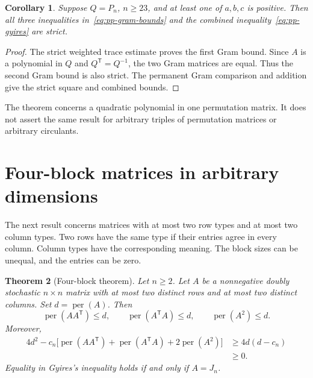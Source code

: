 \documentclass[11pt,a4paper]{article}
\newtheorem{theorem}{Theorem}[section]
\newtheorem{corollary}[theorem]{Corollary}
\theoremstyle{definition}
\theoremstyle{remark}
\newcommand{\per}{\operatorname{per}}
\newcommand{\T}{\mathsf{T}}
\begin{document}
\begin{corollary}\label{cor:pp-strict-cycle}
Suppose $Q=P_n$, $n\ge23$, and at least one of $a,b,c$ is positive.
Then all three inequalities in~\eqref{eq:pp-gram-bounds} and the combined inequality~\eqref{eq:pp-gyires} are strict.
\end{corollary}

\begin{proof}
The strict weighted trace estimate proves the first Gram bound.
Since $A$ is a polynomial in $Q$ and $Q^\T=Q^{-1}$, the two Gram matrices are equal.
Thus the second Gram bound is also strict.
The permanent Gram comparison and addition give the strict square and combined bounds.
\end{proof}

The theorem concerns a quadratic polynomial in one permutation matrix.
It does not assert the same result for arbitrary triples of permutation matrices or arbitrary circulants.

\section{Four-block matrices in arbitrary dimensions}\label{sec:four-block}

The next result concerns matrices with at most two row types and at most two column types. Two rows have the same type if their entries agree
in every column. Column types have the corresponding meaning. The block
sizes can be unequal, and the entries can be zero.

\begin{theorem}[Four-block theorem]\label{thm:four-block}
Let $n\geq 2$. Let $A$ be a nonnegative doubly stochastic $n\times n$
matrix with at most two distinct rows and at most two distinct columns.
Set $d=\per(A)$. Then
\begin{equation}\label{eq:fb-three-contractions}
 \per(AA^\T)\leq d,\qquad
 \per(A^\T A)\leq d,\qquad
 \per(A^2)\leq d.
\end{equation}
Moreover,
\begin{equation}\label{eq:fb-margin}
\begin{split}
 4d^2-c_n\bigl[\per(AA^\T)+\per(A^\T A)+2\per(A^2)\bigr]
 &\geq 4d(d-c_n)\\
 &\geq 0.
\end{split}
\end{equation}
Equality in Gyires's inequality holds if and only if $A=J_n$.
\end{theorem}
\end{document}
